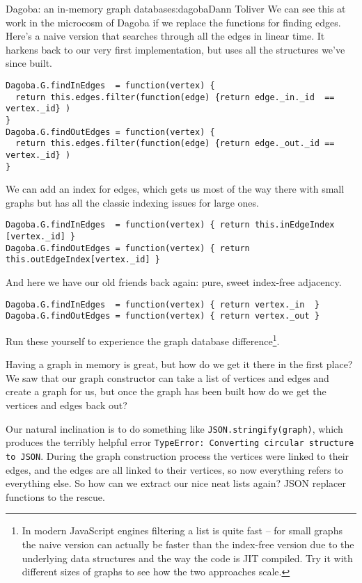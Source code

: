 \begin{aosachapter}{Dagoba: an in-memory graph database}{s:dagoba}{Dann Toliver}
We can see this at work in the microcosm of Dagoba if we replace the
functions for finding edges. Here's a naive version that searches
through all the edges in linear time. It harkens back to our very first
implementation, but uses all the structures we've since built.

\begin{verbatim}
Dagoba.G.findInEdges  = function(vertex) { 
  return this.edges.filter(function(edge) {return edge._in._id  == vertex._id} ) 
}
Dagoba.G.findOutEdges = function(vertex) { 
  return this.edges.filter(function(edge) {return edge._out._id == vertex._id} ) 
}
\end{verbatim}

We can add an index for edges, which gets us most of the way there with
small graphs but has all the classic indexing issues for large ones.

\begin{verbatim}
Dagoba.G.findInEdges  = function(vertex) { return this.inEdgeIndex [vertex._id] }
Dagoba.G.findOutEdges = function(vertex) { return this.outEdgeIndex[vertex._id] }
\end{verbatim}

And here we have our old friends back again: pure, sweet index-free
adjacency.

\begin{verbatim}
Dagoba.G.findInEdges  = function(vertex) { return vertex._in  }
Dagoba.G.findOutEdges = function(vertex) { return vertex._out }
\end{verbatim}

Run these yourself to experience the graph database difference\footnote{In
  modern JavaScript engines filtering a list is quite fast -- for small
  graphs the naive version can actually be faster than the index-free
  version due to the underlying data structures and the way the code is
  JIT compiled. Try it with different sizes of graphs to see how the two
  approaches scale.}.

\label{serialization}

Having a graph in memory is great, but how do we get it there in the
first place? We saw that our graph constructor can take a list of
vertices and edges and create a graph for us, but once the graph has
been built how do we get the vertices and edges back out?

Our natural inclination is to do something like
\texttt{JSON.stringify(graph)}, which produces the terribly helpful
error \texttt{TypeError: Converting circular structure to JSON}. During
the graph construction process the vertices were linked to their edges,
and the edges are all linked to their vertices, so now everything refers
to everything else. So how can we extract our nice neat lists again?
JSON replacer functions to the rescue.


\end{aosachapter}
